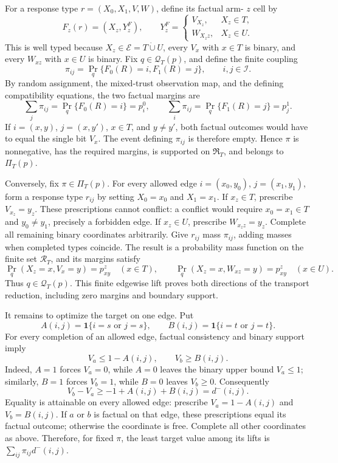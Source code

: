 For a response type \(r=(X_0,X_1,V,W)\), define its factual arm-
\(z\) cell by
\[
 F_z(r)=(X_z,Y_z^F),\qquad
 Y_z^F=\begin{cases}
 V_{X_z},&X_z\in T,\\
 W_{X_z z},&X_z\in U.
 \end{cases}
\]
This is well typed because \(X_z\in\mathcal E=T\mathbin{\dot\cup}U\), every
\(V_x\) with \(x\in T\) is binary, and every \(W_{xz}\) with \(x\in U\)
is binary.  Fix \(q\in\mathcal Q_T(p)\), and define the finite coupling
\[
 \pi_{ij}=\Pr_q\{F_0(R)=i,F_1(R)=j\},\qquad i,j\in\mathcal I.
\]
By random assignment, the mixed-trust observation map, and the defining
compatibility equations, the two factual margins are
\[
 \sum_j\pi_{ij}=\Pr_q\{F_0(R)=i\}=p_i^0,
 \qquad
 \sum_i\pi_{ij}=\Pr_q\{F_1(R)=j\}=p_j^1.
\]
If \(i=(x,y)\), \(j=(x,y')\), \(x\in T\), and \(y\ne y'\), both factual
outcomes would have to equal the single bit \(V_x\).  The event defining
\(\pi_{ij}\) is therefore empty.  Hence \(\pi\) is nonnegative, has the
required margins, is supported on \(\mathfrak R_T\), and belongs to
\(\Pi_T(p)\).

Conversely, fix \(\pi\in\Pi_T(p)\).  For every allowed edge
\(i=(x_0,y_0)\), \(j=(x_1,y_1)\), form a response type \(r_{ij}\) by setting
\(X_0=x_0\) and \(X_1=x_1\).  If \(x_z\in T\), prescribe
\(V_{x_z}=y_z\).  These prescriptions cannot conflict: a conflict would
require \(x_0=x_1\in T\) and \(y_0\ne y_1\), precisely a forbidden edge.
If \(x_z\in U\), prescribe \(W_{x_z z}=y_z\).  Complete all remaining
binary coordinates arbitrarily.  Give \(r_{ij}\) mass \(\pi_{ij}\), adding
masses when completed types coincide.  The result is a probability mass
function on the finite set \(\mathcal R_T\), and its margins satisfy
\[
 \Pr_q(X_z=x,V_x=y)=p^z_{xy}\quad(x\in T),
 \qquad
 \Pr_q(X_z=x,W_{xz}=y)=p^z_{xy}\quad(x\in U).
\]
Thus \(q\in\mathcal Q_T(p)\).  This finite edgewise lift proves both
directions of the transport reduction, including zero margins and boundary
support.

It remains to optimize the target on one edge.  Put
\[
 A(i,j)=\mathbf 1\{i=s\text{ or }j=s\},
 \qquad
 B(i,j)=\mathbf 1\{i=t\text{ or }j=t\}.
\]
For every completion of an allowed edge, factual consistency and binary
support imply
\[
 V_a\le 1-A(i,j),\qquad V_b\ge B(i,j).
\]
Indeed, \(A=1\) forces \(V_a=0\), while \(A=0\) leaves the binary upper
bound \(V_a\le1\); similarly, \(B=1\) forces \(V_b=1\), while \(B=0\)
leaves \(V_b\ge0\).  Consequently
\[
 V_b-V_a\ge-1+A(i,j)+B(i,j)=d^-(i,j).
\]
Equality is attainable on every allowed edge: prescribe
\(V_a=1-A(i,j)\) and \(V_b=B(i,j)\).  If \(a\) or \(b\) is factual on that
edge, these prescriptions equal its factual outcome; otherwise the
coordinate is free.  Complete all other coordinates as above.  Therefore,
for fixed \(\pi\), the least target value among its lifts is
\(\sum_{ij}\pi_{ij}d^-(i,j)\).

